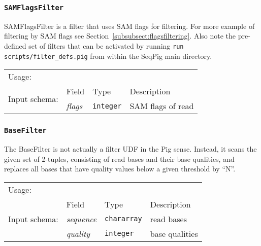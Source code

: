 \subsubsection{\texttt{SAMFlagsFilter}}

SAMFlagsFilter is a filter that uses SAM flags for filtering. For more
example of filtering by SAM flags see
Section~\ref{subsubsect:flagsfiltering}. Also note the pre-defined set
of filters that can be activated by running \texttt{run
  scripts/filter\_defs.pig} from within the SeqPig main directory.

\begin{tabular}{lp{}p{}p{}}
Usage: & \multicolumn{3}{l}{}
\hspace*{-0.55cm}\begin{minipage}{0.85\textwidth}
  \begin{lstlisting}
  DEFINE ReadUnmapped SAMFlagsFilter('HasSegmentUnmapped');
  reads = load 'input.bam' using BamLoader('yes');
  mapped_reads = FILTER reads BY not ReadUnmapped(flags);
  \end{lstlisting}
  \end{minipage}\hfill\kern-\arrayrulewidth
 \\[0.25cm]
\multirow{2}{*}{Input schema:} & Field & Type & Description\\[0.1cm]
& \emph{flags} & \texttt{integer} & SAM flags of read
\end{tabular}

\subsubsection{\texttt{BaseFilter}}

The BaseFilter is not actually a filter UDF in the Pig sense. Instead,
it scans the given set of 2-tuples, consisting of read bases and their
base qualities, and replaces all bases that have quality values below
a given threshold by ``N''.

\begin{tabular}{lp{}p{}p{}}
Usage: & \multicolumn{3}{l}{}
\hspace*{-0.55cm}\begin{minipage}{0.85\textwidth}
  \begin{lstlisting}
  DEFINE baseFilter BaseFilter('50');
  reads = LOAD 'input.fq' USING FastqLoader();
  reads_filtered = FOREACH reads GENERATE instrument, run_number, flow_cell_id,
      lane, tile, xpos, ypos, read, qc_passed, control_number, index_sequence,
      FLATTEN(baseFilter(sequence, quality));
  \end{lstlisting}
  \end{minipage}\hfill\kern-\arrayrulewidth
 \\[0.25cm]
\multirow{3}{*}{Input schema:} & Field & Type & Description\\[0.1cm]
& \emph{sequence} & \texttt{chararray} & read bases\\
& \emph{quality} & \texttt{integer} & base qualities
\end{tabular}\hfill

